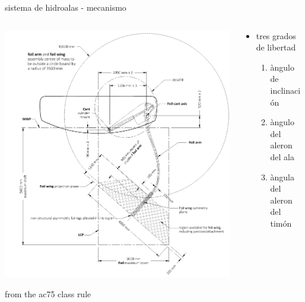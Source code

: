 \documentclass[presentation,aspectratio=169]{beamer}
\begin{document}
\begin{frame}[label={sec:org6b50cdd}]{sistema de hidroalas - mecanismo}
\begin{columns}
\begin{column}{0.5\columnwidth}
\begin{center}
\includegraphics[height=0.8\textheight]{../../figures/ac75-class-foil.png}
\end{center}

{\footnotesize from the ac75 class rule}
\end{column}
\begin{column}{0.5\columnwidth}
\begin{itemize}
\item tres grados de libertad
\begin{enumerate}
\item àngulo de inclinación
\item àngulo del aleron del ala
\item àngula del aleron del timón
\end{enumerate}
\end{itemize}
\end{column}
\end{columns}
\end{frame}
\end{document}
